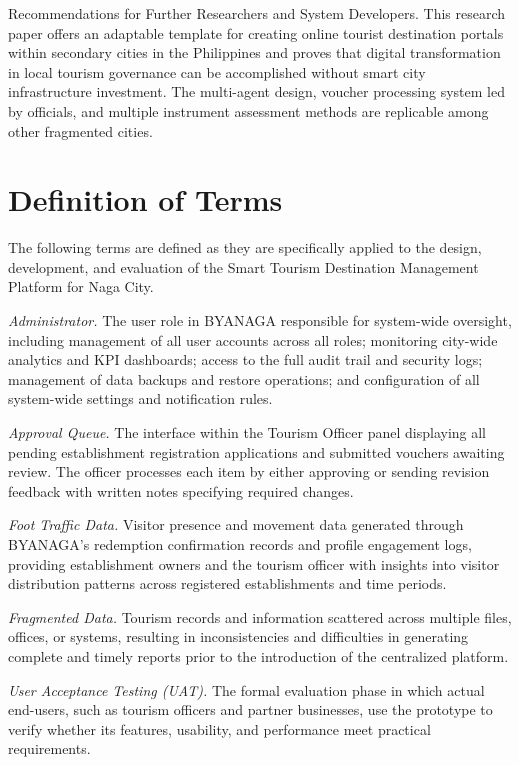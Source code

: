 \documentclass{research}
\begin{document}
Recommendations for Further Researchers and System Developers. This research paper offers an adaptable template for creating online tourist destination portals within secondary cities in the Philippines and proves that digital transformation in local tourism governance can be accomplished without smart city infrastructure investment. The multi-agent design, voucher processing system led by officials, and multiple instrument assessment methods are replicable among other fragmented cities.

\section{Definition of Terms}

The following terms are defined as they are specifically applied to the design, development, and evaluation of the Smart Tourism Destination Management Platform for Naga City.

\textit{Administrator.} The user role in BYANAGA responsible for system-wide oversight, including management of all user accounts across all roles; monitoring city-wide analytics and KPI dashboards; access to the full audit trail and security logs; management of data backups and restore operations; and configuration of all system-wide settings and notification rules.

\textit{Approval Queue.} The interface within the Tourism Officer panel displaying all pending establishment registration applications and submitted vouchers awaiting review. The officer processes each item by either approving or sending revision feedback with written notes specifying required changes.

\textit{Foot Traffic Data.} Visitor presence and movement data generated through BYANAGA's redemption confirmation records and profile engagement logs, providing establishment owners and the tourism officer with insights into visitor distribution patterns across registered establishments and time periods.

\textit{Fragmented Data.} Tourism records and information scattered across multiple files, offices, or systems, resulting in inconsistencies and difficulties in generating complete and timely reports prior to the introduction of the centralized platform.

\textit{User Acceptance Testing (UAT).} The formal evaluation phase in which actual end-users, such as tourism officers and partner businesses, use the prototype to verify whether its features, usability, and performance meet practical requirements.
\end{document}
